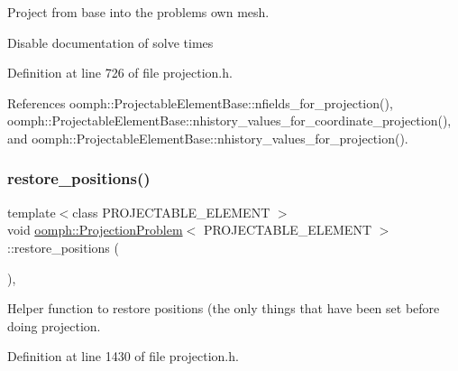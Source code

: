 Project from base into the problem\textquotesingle{}s own mesh. 

Disable documentation of solve times 

Definition at line 726 of file projection.\+h.



References oomph\+::\+Projectable\+Element\+Base\+::nfields\+\_\+for\+\_\+projection(), oomph\+::\+Projectable\+Element\+Base\+::nhistory\+\_\+values\+\_\+for\+\_\+coordinate\+\_\+projection(), and oomph\+::\+Projectable\+Element\+Base\+::nhistory\+\_\+values\+\_\+for\+\_\+projection().

\mbox{\label{classoomph_1_1ProjectionProblem_aeb3c03ed8381f389d3d598487b6fb987}} 
\subsubsection{\texorpdfstring{restore\+\_\+positions()}{restore\_positions()}}
{\footnotesize\ttfamily template$<$class P\+R\+O\+J\+E\+C\+T\+A\+B\+L\+E\+\_\+\+E\+L\+E\+M\+E\+NT $>$ \\
void \hyperlink{classoomph_1_1ProjectionProblem}{oomph\+::\+Projection\+Problem}$<$ P\+R\+O\+J\+E\+C\+T\+A\+B\+L\+E\+\_\+\+E\+L\+E\+M\+E\+NT $>$\+::restore\+\_\+positions (\begin{DoxyParamCaption}{ }\end{DoxyParamCaption})\hspace{0.3cm}{\ttfamily [inline]}, {\ttfamily [private]}}



Helper function to restore positions (the only things that have been set before doing projection. 



Definition at line 1430 of file projection.\+h.

\mbox{\label{classoomph_1_1ProjectionProblem_ad8f93fb7e51a0e427b634d4dac8e96a3}} 
